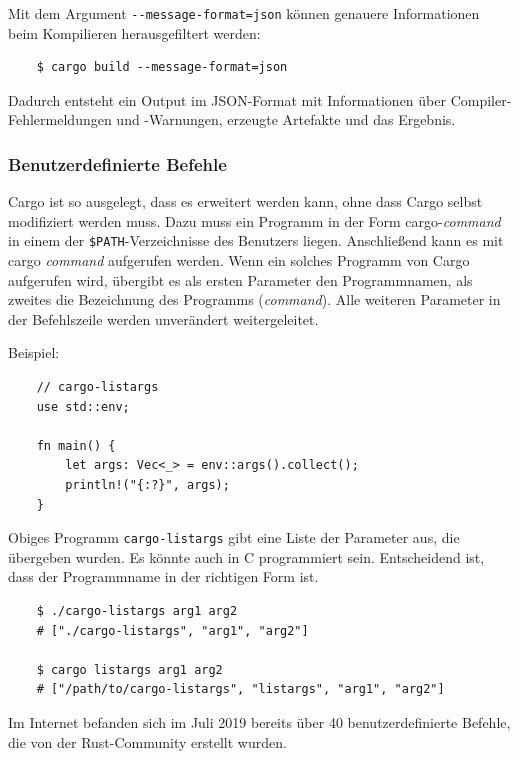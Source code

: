 Mit dem Argument \verb"--message-format=json" können genauere Informationen beim Kompilieren herausgefiltert werden:

\begin{lstlisting}
    $ cargo build --message-format=json
\end{lstlisting}

Dadurch entsteht ein Output im JSON-Format mit Informationen über Compiler-Fehlermeldungen und -Warnungen, erzeugte Artefakte und das Ergebnis.

\subsubsection{Benutzerdefinierte Befehle}

Cargo ist so ausgelegt, dass es erweitert werden kann, ohne dass Cargo selbst modifiziert werden muss. Dazu muss ein Programm in der Form cargo-\textit{command} in einem der \verb"$PATH"-Verzeichnisse des Benutzers liegen. Anschließend kann es mit \glqq cargo \textit{command}\grqq{} aufgerufen werden. Wenn ein solches Programm von Cargo aufgerufen wird, übergibt es als ersten Parameter den Programmnamen, als zweites die Bezeichnung des Programms (\textit{command}). Alle weiteren Parameter in der Befehlszeile werden unverändert weitergeleitet.

Beispiel:

\begin{lstlisting}
    // cargo-listargs
    use std::env;

    fn main() {
        let args: Vec<_> = env::args().collect();
        println!("{:?}", args);
    }
\end{lstlisting}

Obiges Programm \verb"cargo-listargs" gibt eine Liste der Parameter aus, die über\-geben wurden. Es könnte auch in C programmiert sein. Entscheidend ist, dass der Programmname in der richtigen Form ist.

\begin{lstlisting}
    $ ./cargo-listargs arg1 arg2
    # ["./cargo-listargs", "arg1", "arg2"]

    $ cargo listargs arg1 arg2
    # ["/path/to/cargo-listargs", "listargs", "arg1", "arg2"]
\end{lstlisting}

Im Internet befanden sich im Juli 2019 bereits über 40 benutzerdefinierte Befehle, die von der Rust-Community erstellt wurden. \cite{CargoSubcommands}
